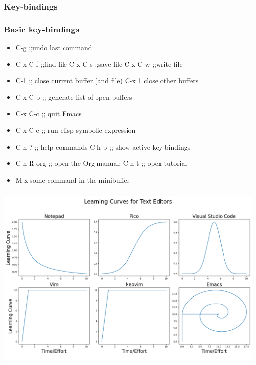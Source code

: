 \documentclass[aspectratio=169]{beamer}
\begin{document}
\subsubsection{Key-bindings}
\begin{frame}
\frametitle{Basic key-bindings}
\Large{
\begin{center}
\begin{itemize}[font=$\bullet$\scshape\bfseries]
    \item C-g  ;;undo last command
    \item C-x C-f ;;find file  C-x C-s ;;save file     C-x C-w ;;write file
    \item C-1 ;; close current buffer (and file)  C-x 1  close other buffers
    \item C-x C-b  ;; generate list of open buffers
    \item C-x C-c  ;; quit Emacs
    \item C-x C-e  ;; run elisp symbolic expression
    \item C-h ? ;; help commands   C-h b ;; show active key bindings
    \item C-h R org ;; open the Org-manual; C-h t ;; open tutorial
    \item M-x some command in the minibuffer
\end{itemize}
\end{center}
}
\end{frame}


\subsubsection{}
\begin{frame}
\frametitle{}
\begin{center}
    \includegraphics[scale=0.34]{Figures/learning_curves.png}
\end{center}
\end{frame}
\end{document}
